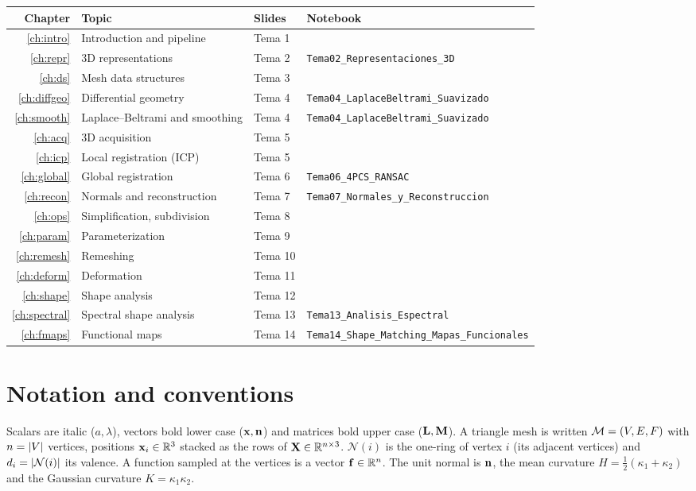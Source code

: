 \begin{center}
\footnotesize
\begin{tabular}{@{}rlll@{}}
\toprule
Chapter & Topic & Slides & Notebook \\
\midrule
\ref{ch:intro} & Introduction and pipeline & Tema 1 & \\
\ref{ch:repr} & 3D representations & Tema 2 & \texttt{Tema02\_Representaciones\_3D} \\
\ref{ch:ds} & Mesh data structures & Tema 3 & \\
\ref{ch:diffgeo} & Differential geometry & Tema 4 & \texttt{Tema04\_LaplaceBeltrami\_Suavizado} \\
\ref{ch:smooth} & Laplace--Beltrami and smoothing & Tema 4 & \texttt{Tema04\_LaplaceBeltrami\_Suavizado} \\
\ref{ch:acq} & 3D acquisition & Tema 5 & \\
\ref{ch:icp} & Local registration (ICP) & Tema 5 & \\
\ref{ch:global} & Global registration & Tema 6 & \texttt{Tema06\_4PCS\_RANSAC} \\
\ref{ch:recon} & Normals and reconstruction & Tema 7 & \texttt{Tema07\_Normales\_y\_Reconstruccion} \\
\ref{ch:ops} & Simplification, subdivision & Tema 8 & \\
\ref{ch:param} & Parameterization & Tema 9 & \\
\ref{ch:remesh} & Remeshing & Tema 10 & \\
\ref{ch:deform} & Deformation & Tema 11 & \\
\ref{ch:shape} & Shape analysis & Tema 12 & \\
\ref{ch:spectral} & Spectral shape analysis & Tema 13 & \texttt{Tema13\_Analisis\_Espectral} \\
\ref{ch:fmaps} & Functional maps & Tema 14 & \texttt{Tema14\_Shape\_Matching\_Mapas\_Funcionales} \\
\bottomrule
\end{tabular}
\end{center}

\section*{Notation and conventions}

Scalars are italic ($a, \lambda$), vectors bold lower case ($\mathbf{x}, \mathbf{n}$) and matrices bold upper
case ($\mathbf{L}, \mathbf{M}$). A triangle mesh is written $\mathcal{M}=(V,E,F)$ with $n=\left\lvert V\right\rvert$ vertices, positions
$\mathbf{x}_i\in\mathbb{R}^3$ stacked as the rows of $\mathbf{X}\in\mathbb{R}^{n\times 3}$. $\mathcal N(i)$ is the one-ring of
vertex $i$ (its adjacent vertices) and $d_i=\left\lvert \mathcal N(i)\right\rvert$ its valence. A function sampled at
the vertices is a vector $\mathbf{f}\in\mathbb{R}^n$. The unit normal is $\mathbf{n}$, the mean curvature
$H=\tfrac12(\kappa_1+\kappa_2)$ and the Gaussian curvature $K=\kappa_1\kappa_2$.


